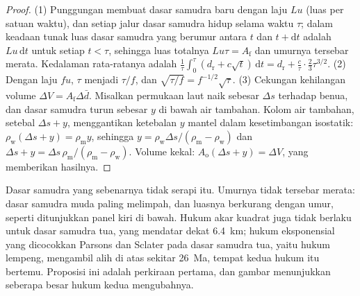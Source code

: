 \begin{proof}
(1) Punggungan membuat dasar samudra baru dengan laju $Lu$ (luas per satuan waktu), dan setiap jalur dasar samudra hidup
selama waktu $\tau$; dalam keadaan tunak luas dasar samudra yang berumur antara $t$ dan $t + \mathrm{d}t$
adalah $Lu\,\mathrm{d}t$ untuk setiap $t < \tau$, sehingga luas totalnya $Lu\tau = A_{\text{f}}$ dan
umurnya tersebar merata. Kedalaman rata-ratanya adalah
$\frac1\tau\int_0^\tau (d_{\text{r}} + c\sqrt t)\,\mathrm{d}t = d_{\text{r}} + \frac{c}{\tau}
\cdot\frac23\tau^{3/2}$. (2) Dengan laju $fu$, $\tau$ menjadi $\tau/f$, dan
$\sqrt{\tau/f} = f^{-1/2}\sqrt\tau$. (3) Cekungan kehilangan volume $\Delta V = A_{\text{f}}
\Delta\bar d$. Misalkan permukaan laut naik sebesar $\Delta s$ terhadap benua, dan dasar samudra
turun sebesar $y$ di bawah air tambahan. Kolom air tambahan, setebal $\Delta s + y$, menggantikan
ketebalan $y$ mantel dalam kesetimbangan isostatik: $\rho_{\text{w}}(\Delta s + y) =
\rho_{\text{m}} y$, sehingga $y = \rho_{\text{w}}\Delta s/(\rho_{\text{m}} - \rho_{\text{w}})$ dan
$\Delta s + y = \Delta s\,\rho_{\text{m}}/(\rho_{\text{m}} - \rho_{\text{w}})$. Volume
kekal: $A_{\text{o}}(\Delta s + y) = \Delta V$, yang memberikan hasilnya.
\end{proof}

Dasar samudra yang sebenarnya tidak serapi itu. Umurnya tidak tersebar merata: dasar samudra muda paling melimpah,
dan luasnya berkurang dengan umur, seperti ditunjukkan panel kiri di bawah. Hukum akar kuadrat juga tidak berlaku untuk
dasar samudra tua, yang mendatar dekat \qty{6.4}{km}; hukum eksponensial yang dicocokkan Parsons dan Sclater
pada dasar samudra tua, yaitu hukum lempeng, mengambil alih di atas sekitar \qty{26}{Ma}, tempat kedua hukum itu
bertemu. Proposisi ini adalah perkiraan pertama, dan gambar
menunjukkan seberapa besar hukum kedua mengubahnya.

